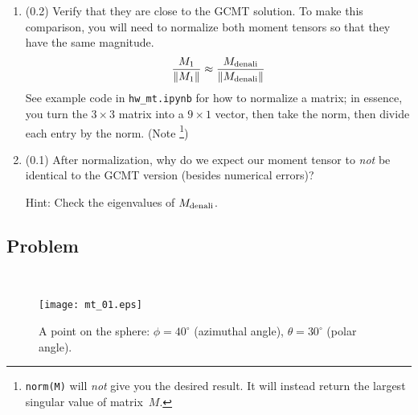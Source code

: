 \documentclass[11pt,titlepage,fleqn]{article}
\newcommand{\Mmat}{M}
\begin{document}
\begin{enumerate}
\begin{enumerate}
\item (0.2) Verify that they are close to the GCMT solution. To make this comparison, you will need to normalize both moment tensors so that they have the same magnitude.
%
\begin{equation}
\frac{\Mmat_1}{\|\Mmat_1\|} \approx \frac{\Mmat_{\rm denali} }{\|\Mmat_{\rm denali}\|}
\end{equation}
%
See example code in \verb+hw_mt.ipynb+ for how to normalize a matrix; in essence, you turn the $3 \times 3$ matrix into a $9 \times 1$ vector, then take the norm, then divide each entry by the norm. (Note \footnote{{\tt norm(M)} will {\em not} give you the desired result. It will instead return the largest singular value of matrix~$\Mmat$.})

\item (0.1) After normalization, why do we expect our moment tensor to {\em not} be identical to the GCMT version (besides numerical errors)?

Hint: Check the eigenvalues of $\Mmat_{\rm denali}$.


\end{enumerate}

\end{enumerate}


\subsection*{Problem} \howmuchtime\




\begin{figure}[h]
\centering
\texttt{[image: mt\_01.eps]}
\caption[]
{{
A point on the sphere: $\phi = 40^\circ$ (azimuthal angle), $\theta = 30^\circ$ (polar angle).
\label{fig:globe}
}}
\end{figure}
\end{document}
